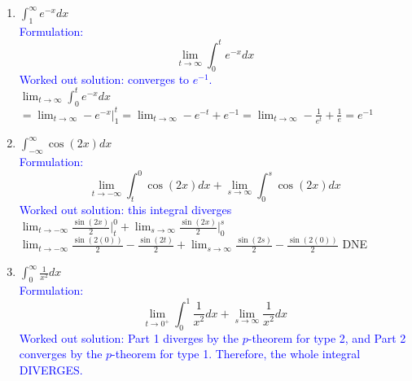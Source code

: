 \documentclass{ximera}
\begin{document}
\begin{exercise}
\begin{enumerate}
        $=\lim_{t\rightarrow 0^+} \frac{t^2}{2}\ln(t)-\frac12 \ln(1) -\frac{x^2}{4}\bigg|_t^1$\\
        $=\lim_{t\rightarrow 0^+} \frac{t^2}{2}\ln(t)-\frac12 \ln(1) -\frac{1}{4}+\frac{t^2}{4}$\\
        $\lim_{t\rightarrow 0^+} \frac{t^2}{2}\ln(t)$ gives a $0\cdot -\infty$ term and needs l'Hopital's rule.\\
        $\lim_{t\rightarrow 0^+} \frac{\ln(t)}{2t^{-2}}$ gives an $\frac{\infty}{\infty}$ form, and thus we can use l'HR.\\
        $\lim_{t\rightarrow 0^+} \frac{\frac{1}{t}}{-4t^{-3}}=\lim_{t\rightarrow 0^+}-\frac{t^2}{4}=0$\\
        Then our original limit is $=0-0-\frac{1}{4}+0=-\frac14$
        \item $\int_1^\infty e^{-x}dx$\\
        \textcolor{blue}{Formulation:}
        $$\lim_{t\rightarrow \infty} \int_0^t e^{-x}dx$$
        \textcolor{blue}{Worked out solution: converges to $e^{-1}$.\\}
        $\lim_{t\rightarrow \infty} \int_0^t e^{-x}dx$\\
        $=$$\lim_{t\rightarrow \infty} -e^{-x}\bigg|_1^t=\lim_{t\rightarrow\infty} -e^{-t}+e^{-1}=\lim_{t\rightarrow \infty} -\frac1{e^t}+\frac1e=e^{-1}$
        \item $\int_{-\infty}^\infty \cos(2x)dx$\\
        \textcolor{blue}{Formulation:}
        $$\lim_{t\rightarrow -\infty}\int_t^0 \cos(2x)dx+\lim_{s\rightarrow \infty} \int_0^s \cos(2x)dx$$
        \textcolor{blue}{Worked out solution: this integral diverges\\}
        $\lim_{t\rightarrow -\infty}\frac{\sin(2x)}{2}\bigg|_t^0+\lim_{s\rightarrow \infty} \frac{\sin(2x)}{2}\bigg|_0^s$\\
        $\lim_{t\rightarrow -\infty}\frac{\sin(2(0))}{2}-\frac{\sin(2t)}{2}+\lim_{s\rightarrow \infty} \frac{\sin(2s)}{2}-\frac{\sin(2(0))}{2}$ DNE\\

        \item $\int_0^\infty \frac{1}{x^2}dx$\\
        \textcolor{blue}{Formulation:}
        $$\lim_{t\rightarrow 0^+} \int_0^1 \frac{1}{x^2}dx+\lim_{s\rightarrow \infty}\frac{1}{x^2}dx$$
        \textcolor{blue}{Worked out solution: Part 1 diverges by the $p$-theorem for type 2, and Part 2 converges by the $p$-theorem for type 1.  Therefore, the whole integral DIVERGES.}
    \end{enumerate}
\end{exercise}
\end{document}
